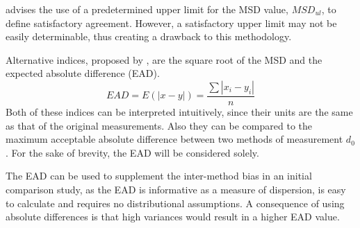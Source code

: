 \documentclass[12pt, a4paper]{report}
\theoremstyle{plain}
\theoremstyle{definition}
\theoremstyle{remark}
\begin{document}
\citet{Barnhart} advises the use of a predetermined upper limit
for the MSD value, $MSD_{ul}$, to define satisfactory agreement.
However, a satisfactory upper limit may not be easily
determinable, thus creating a drawback to this methodology.


Alternative indices, proposed by \citet{Barnhart}, are the square root of the MSD and the expected absolute difference (EAD). 
\[
EAD = E(|x - y|) = \frac{\sum |x_{i}- y_{i}|}{n}
\]
Both of these indices can be interpreted intuitively, since their units are the same as that of the original measurements. Also they can be compared to the maximum acceptable absolute difference between two methods of measurement $d_{0}$. For the sake of brevity, the EAD will be considered solely.

The EAD can be used to supplement the inter-method bias in an
initial comparison study, as the EAD is informative as a measure
of dispersion, is easy to calculate and requires no distributional
assumptions. A consequence of using absolute differences is that high variances would result in a higher EAD value. 

\end{document}
